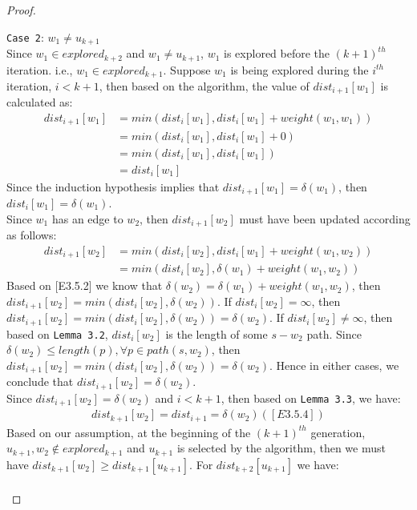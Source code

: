 \documentclass[11pt, oneside]{article}   	%
\theoremstyle{definition}
\begin{document}
\begin{proof}
\begin{itemize}
\begin{enumerate}
  \texttt{Case 2}: $w_1 \neq u_{k+1}$
  \\ 
  Since $w_1 \in explored_{k+2}$ and $w_1 \neq u_{k+1}$, $w_1$ is explored before the $(k+1)^{th}$ iteration. i.e., $w_1 \in explored_{k+1}$. Suppose $w_1$ is being explored during the $i^{th}$ iteration, $i < k+1$, then based on the algorithm, the value of $dist_{i+1}[w_1]$ is calculated as: 
  \begin{align*}
        dist_{i+1}[w_1] &= min(dist_{i}[w_1], dist_{i}[w_1] + weight(w_1,w_1)) \\
                        &= min(dist_{i}[w_1], dist_{i}[w_1] + 0)\\
                        &= min(dist_{i}[w_1], dist_{i}[w_1])\\
                        &= dist_{i}[w_1]
  \end{align*}
  Since the induction hypothesis implies that $dist_{i+1}[w_1] = \delta(w_1)$, then $dist_i[w_1] = \delta(w_1)$. 
  \\
  Since $w_1$ has an edge to $w_2$, then $dist_{i+1}[w_2]$ must have been updated according as follows: 
  \begin{align*}
     dist_{i+1}[w_2] &= min(dist_i[w_2], dist_i[w_1] + weight(w_1,w_2)) \\
                     &= min(dist_i[w_2], \delta(w_1) + weight(w_1, w_2))
  \end{align*}
  Based on [E3.5.2] we know that $\delta(w_2) =  \delta(w_1) + weight(w_1, w_2)$, then $dist_{i+1}[w_2] = min(dist_i[w_2], \delta(w_2))$. If $dist_i[w_2] = \infty$, then $dist_{i+1}[w_2] = min(dist_i[w_2], \delta(w_2)) = \delta(w_2)$. If $dist_i[w_2] \neq \infty$, then based on \texttt{Lemma 3.2}, $dist_i[w_2]$ is the length of some $s-w_2$ path. Since $\delta(w_2) \leq length(p), \forall p \in path(s, w_2)$, then $dist_{i+1}[w_2] = min(dist_i[w_2], \delta(w_2)) = \delta(w_2)$. Hence in either cases, we conclude that $dist_{i+1}[w_2] = \delta(w_2)$. 
  \\
  Since $dist_{i+1}[w_2] = \delta(w_2)$ and $i < k+1$, then based on \texttt{Lemma 3.3}, we have:
  \begin{align*}
  dist_{k+1}[w_2] = dist_{i+1} = \delta(w_2) ([E3.5.4])
  \end{align*}
  Based on our assumption, at the beginning of the $(k+1)^{th}$ generation, $u_{k+1}, w_2 \notin explored_{k+1}$ and $u_{k+1}$ is selected by the algorithm, then we must have $dist_{k+1}[w_2] \geq dist_{k+1}[u_{k+1}]$. For $dist_{k+2}[u_{k+1}]$ we have: 
  \begin{align*}

\end{align*}
\end{enumerate}
\end{itemize}
\end{proof}
\end{document}
